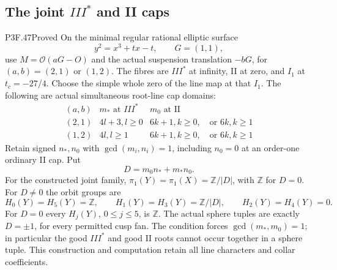 \subsection{The joint \texorpdfstring{$III^*$}{III*} and II caps}
\begin{statement}{P3F.47}{Proved}
On the minimal regular rational elliptic surface
\[
 y^2=x^3+tx-t,\qquad G=(1,1),
\]
use $M=\mathcal O(aG-O)$ and the actual suspension translation
$-bG$, for $(a,b)=(2,1)$ or $(1,2)$. The fibres are
$III^*$ at infinity, II at zero, and $I_1$ at $t_c=-27/4$.
Choose the simple whole zero of the line map at that $I_1$.
The following are actual simultaneous root-line cap domains:
\[
\begin{array}{c|c|c}
(a,b)&m_*\text{ at }III^*&m_0\text{ at II}\\ \hline
(2,1)&4l+3, l\geq0&6k+1, k\geq0,\quad\text{or }6k, k\geq1\\
(1,2)&4l, l\geq1&6k+1, k\geq0,\quad\text{or }6k, k\geq1
\end{array}                                            \tag{F47.1}
\]
Retain signed $n_*,n_0$ with $\gcd(m_i,n_i)=1$, including
$n_0=0$ at an order-one ordinary II cap. Put
\[
                         D=m_0n_*+m_*n_0.              \tag{F47.2}
\]
For the constructed joint family,
$\pi_1(Y)=\pi_1(X)=\mathbb Z/|D|$, with $\mathbb Z$ for $D=0$.
For $D\ne0$ the orbit groups are
\[
 H_0(Y)=H_5(Y)=\mathbb Z,\qquad
 H_1(Y)=H_3(Y)=\mathbb Z/|D|,\qquad H_2(Y)=H_4(Y)=0.
\]
For $D=0$ every $H_j(Y)$, $0\leq j\leq5$, is $\mathbb Z$.
The actual sphere tuples are exactly $D=\pm1$, for every
permitted cusp fan. The condition forces $\gcd(m_*,m_0)=1$;
in particular the good $III^*$ and good II roots cannot occur
together in a sphere tuple. This construction and computation
retain all line characters and collar coefficients.
\end{statement}
